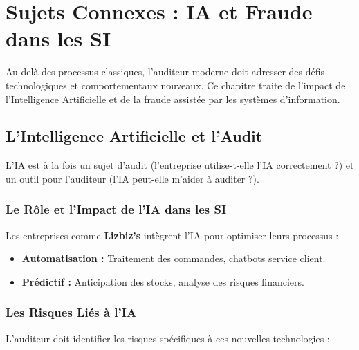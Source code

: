 
\chapter{Sujets Connexes : IA et Fraude dans les SI}\label{chap:07_sujets_connexes}

Au-delà des processus classiques, l'auditeur moderne doit adresser des défis technologiques et comportementaux nouveaux. Ce chapitre traite de l'impact de l'Intelligence Artificielle et de la fraude assistée par les systèmes d'information.

\section{L'Intelligence Artificielle et l'Audit}

L'IA est à la fois un sujet d'audit (l'entreprise utilise-t-elle l'IA correctement ?) et un outil pour l'auditeur (l'IA peut-elle m'aider à auditer ?).

\subsection{Le Rôle et l'Impact de l'IA dans les SI}

Les entreprises comme \textbf{Lizbiz's} intègrent l'IA pour optimiser leurs processus :
\begin{itemize}
    \item \textbf{Automatisation :} Traitement des commandes, chatbots service client.
    \item \textbf{Prédictif :} Anticipation des stocks, analyse des risques financiers.
\end{itemize}

\subsection{Les Risques Liés à l'IA}

L'auditeur doit identifier les risques spécifiques à ces nouvelles technologies :

